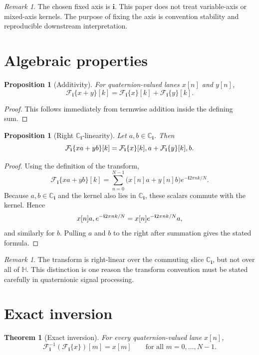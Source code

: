\documentclass[11pt]{article}
\newtheorem{proposition}[definition]{Proposition}
\newtheorem{theorem}[definition]{Theorem}
\theoremstyle{remark}
\newtheorem{remark}[definition]{Remark}
\newcommand{\C}{\mathbb{C}}
\newcommand{\HH}{\mathbb{H}}
\newcommand{\Ci}{\C_{\mathbf{i}}}
\newcommand{\ii}{\mathbf{i}}
\newcommand{\F}{\mathcal{F}_{\ii}}
\newcommand{\Finv}{\mathcal{F}_{\ii}^{-1}}
\begin{document}
\begin{remark}
The chosen fixed axis is \(\ii\). This paper does not treat variable-axis or mixed-axis kernels. The purpose of fixing the axis is convention stability and reproducible downstream interpretation.
\end{remark}

\section{Algebraic properties}

\begin{proposition}[Additivity]
For quaternion-valued lanes \(x[n]\) and \(y[n]\),
\[
\F\{x+y\}[k]=\F\{x\}[k]+\F\{y\}[k].
\]
\end{proposition}

\begin{proof}
This follows immediately from termwise addition inside the defining sum.
\end{proof}

\begin{proposition}[Right \texorpdfstring{$\Ci$}{Ci}-linearity]
Let \(a,b\in\Ci\). Then
\[
\F\{xa+yb\}[k]=\F\{x\}[k]\\,a+\F\{y\}[k]\\,b.
\]
\end{proposition}

\begin{proof}
Using the definition of the transform,
\[
\F\{xa+yb\}[k]
=
\sum_{n=0}^{N-1}\bigl(x[n]a+y[n]b\bigr)e^{-\ii 2\pi nk/N}.
\]
Because \(a,b\in\Ci\) and the kernel also lies in \(\Ci\), these scalars commute with the kernel. Hence
\[
x[n]a\\,e^{-\ii 2\pi nk/N}=x[n]e^{-\ii 2\pi nk/N}a,
\]
and similarly for \(b\). Pulling \(a\) and \(b\) to the right after summation gives the stated formula.
\end{proof}

\begin{remark}
The transform is right-linear over the commuting slice \(\Ci\), but not over all of \(\HH\). This distinction is one reason the transform convention must be stated carefully in quaternionic signal processing.
\end{remark}

\section{Exact inversion}

\begin{theorem}[Exact inversion]
For every quaternion-valued lane \(x[n]\),
\[
\Finv(\F\{x\})[m]=x[m]
\qquad
\text{for all } m=0,\dots,N-1.
\]
\end{theorem}
\end{document}
